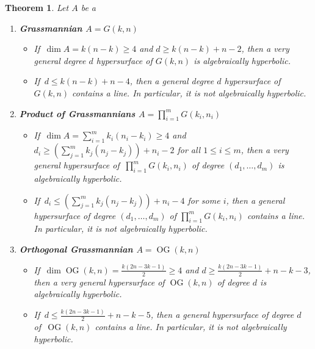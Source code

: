 \documentclass[11pt]{amsart}
\numberwithin{equation}{section}
\newtheorem{theorem}{Theorem}[section]
\theoremstyle{definition}
\theoremstyle{remark}
\DeclareMathOperator{\OG}{OG}
\begin{document}
{\samepage
\begin{theorem} Let $A$ be a
    \begin{enumerate}[itemsep=8pt]
    
        \item \textbf{Grassmannian $A=G(k,n)$}

        \begin{itemize}[itemsep = 4pt]
            \item If\, $\dim A=k(n-k)\ge 4$ and $d\ge k(n-k)+n-2$, then a very general degree $d$ hypersurface of $G(k,n)$ is algebraically hyperbolic.
            \item If\, $d\le k(n-k)+n-4$, then a general degree $d$ hypersurface of $G(k,n)$ contains a line. In particular, it is not algebraically hyperbolic.
        \end{itemize}

        \item \textbf{Product of Grassmannians $A = \prod_{i=1}^m G(k_i,n_i)$}
        \begin{itemize}[itemsep = 4pt]
            \item If\, $\dim A = \sum_{i=1}^m k_i(n_i-k_i)\ge 4$ and $d_i\ge \left (\sum_{j=1}^m k_j(n_j-k_j)\right ) + n_i - 2$ for all $1\le i\le m$, then a very general hypersurface of\, $\prod_{i=1}^m G(k_i,n_i)$ of degree $(d_1,\hdots,d_m)$ is algebraically hyperbolic.

            \item If\, $d_i\le \left (\sum_{j=1}^m k_j(n_j-k_j)\right ) + n_i - 4$ for some $i$, then a general hypersurface of degree $(d_1,\hdots ,d_m)$ of $\prod_{i=1}^m G(k_i,n_i)$ contains a line. In particular, it is not algebraically hyperbolic.
        \end{itemize}

        \item \textbf{Orthogonal Grassmannian $A=\OG(k,n)$}
        \begin{itemize}[itemsep = 4pt]
            \item If\, $\dim \OG(k,n)=\frac{k(2n-3k-1)}{2}\ge 4$ and $d\ge \frac{k(2n-3k-1)}{2}+n-k-3$, then a very general hypersurface of $\OG(k,n)$ of degree $d$ is algebraically hyperbolic.

            \item If\, $d\le \frac{k(2n-3k-1)}{2}+n-k-5$, then a general hypersurface of degree $d$ of\, $\OG(k,n)$ contains a line. In particular, it is not algebraically hyperbolic.
        \end{itemize}
        

\end{enumerate}
\end{theorem}}
\end{document}
